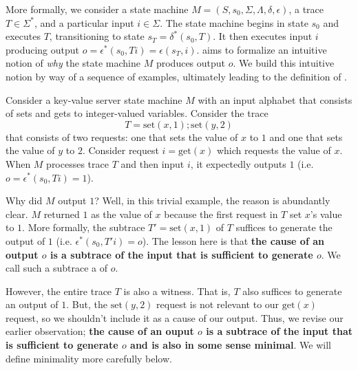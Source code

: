 More formally, we consider a state machine $M = (S, s_0, \Sigma, \Lambda,
\delta, \epsilon)$, a trace $T \in \Sigma^*$, and a particular input $i \in
\Sigma$. The state machine begins in state $s_0$ and executes $T$,
transitioning to state $s_T = \delta^*(s_0, T)$. It then executes input $i$
producing output $o = \epsilon^*(s_0, Ti) = \epsilon(s_T, i)$. \Watprovenance{}
aims to formalize an intuitive notion of \emph{why} the state machine $M$
produces output $o$. We build this intuitive notion by way of a sequence of
examples, ultimately leading to the definition of \watprovenance{}.

\begin{example}
  \newcommand{\kvset}{\text{set}}
  \newcommand{\kvget}{\text{get}}
  Consider a key-value server state machine $M$ with an input alphabet that
  consists of sets and gets to integer-valued variables. Consider the trace
  \[
    T = \kvset(x, 1); \kvset(y, 2)
  \]
  that consists of two requests: one that sets the value of $x$ to $1$ and one
  that sets the value of $y$ to $2$. Consider request $i = \kvget(x)$ which
  requests the value of $x$. When $M$ processes trace $T$ and then input $i$,
  it expectedly outputs $1$ (i.e.\ $o = \epsilon^*(s_0, Ti) = 1$).

  Why did $M$ output $1$? Well, in this trivial example, the reason is
  abundantly clear. $M$ returned $1$ as the value of $x$ because the first
  request in $T$ set $x$'s value to $1$. More formally, the subtrace $T' =
  \kvset(x, 1)$ of $T$ suffices to generate the output of $1$ (i.e.
  $\epsilon^*(s_0, T'i) = o$). The lesson here is that \textbf{the cause of an
  output $o$ is a subtrace of the input that is sufficient to generate $o$}. We
  call such a subtrace a  of $o$.

  However, the entire trace $T$ is also a witness. That is, $T$ also suffices
  to generate an output of $1$. But, the $\kvset(y, 2)$ request is not relevant
  to our $\kvget(x)$ request, so we shouldn't include it as a cause of our
  output. Thus, we revise our earlier observation; \textbf{the cause of an
  ouput $o$ is a subtrace of the input that is sufficient to generate $o$ and
  is also in some sense minimal}. We will define minimality more carefully
  below.
\end{example}

